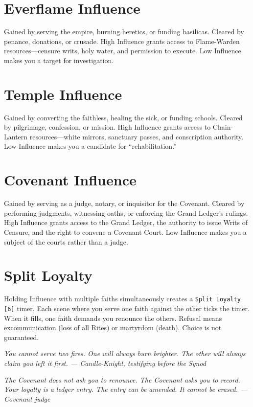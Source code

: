 \documentclass{book}
\newcommand{\citation}[1]{\textcolor{marginalia}{\small\textit{#1}}}
\begin{document}
\section{Everflame Influence}

Gained by serving the empire, burning heretics, or funding basilicas. Cleared by penance, donations, or crusade. High Influence grants access to Flame-Warden resources---censure writs, holy water, and permission to execute. Low Influence makes you a target for investigation.

\section{Temple Influence}

Gained by converting the faithless, healing the sick, or funding schools. Cleared by pilgrimage, confession, or mission. High Influence grants access to Chain-Lantern resources---white mirrors, sanctuary passes, and conscription authority. Low Influence makes you a candidate for ``rehabilitation.''

\section{Covenant Influence}

Gained by serving as a judge, notary, or inquisitor for the Covenant. Cleared by performing judgments, witnessing oaths, or enforcing the Grand Ledger's rulings. High Influence grants access to the Grand Ledger, the authority to issue Writs of Censure, and the right to convene a Covenant Court. Low Influence makes you a subject of the courts rather than a judge.

\section{Split Loyalty}

Holding Influence with multiple faiths simultaneously creates a \texttt{Split Loyalty [6]} timer. Each scene where you serve one faith against the other ticks the timer. When it fills, one faith demands you renounce the others. Refusal means excommunication (loss of all Rites) or martyrdom (death). Choice is not guaranteed.

\citation{You cannot serve two fires. One will always burn brighter. The other will always claim you left it first. --- Candle-Knight, testifying before the Synod}

\citation{The Covenant does not ask you to renounce. The Covenant asks you to \textit{record}. Your loyalty is a ledger entry. The entry can be amended. It cannot be erased. --- Covenant judge}
\end{document}
